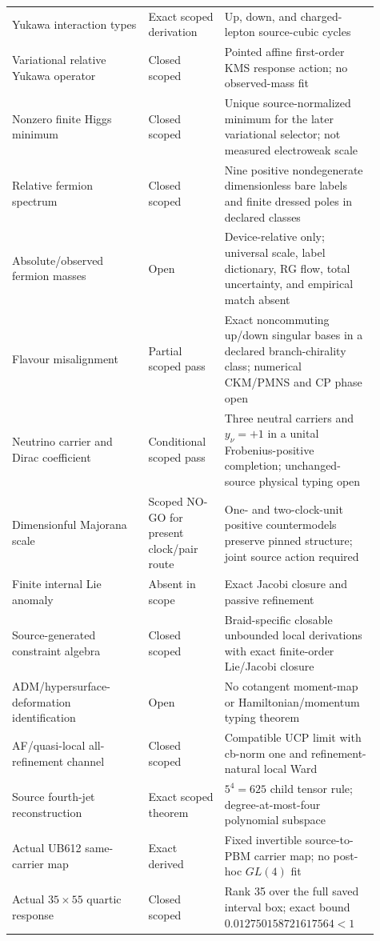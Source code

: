 \documentclass[11pt]{article}
\theoremstyle{definition}
\theoremstyle{remark}
\begin{document}
\begin{longtable}{>{\raggedright\arraybackslash}p{0.34\linewidth} >{\raggedright\arraybackslash}p{0.19\linewidth} >{\raggedright\arraybackslash}p{0.38\linewidth}}
Yukawa interaction types & Exact scoped derivation & Up, down, and charged-lepton source-cubic cycles \\
Variational relative Yukawa operator & Closed scoped & Pointed affine first-order KMS response action; no observed-mass fit \\
Nonzero finite Higgs minimum & Closed scoped & Unique source-normalized minimum for the later variational selector; not measured electroweak scale \\
Relative fermion spectrum & Closed scoped & Nine positive nondegenerate dimensionless bare labels and finite dressed poles in declared classes \\
Absolute/observed fermion masses & Open & Device-relative only; universal scale, label dictionary, RG flow, total uncertainty, and empirical match absent \\
Flavour misalignment & Partial scoped pass & Exact noncommuting up/down singular bases in a declared branch-chirality class; numerical CKM/PMNS and CP phase open \\
Neutrino carrier and Dirac coefficient & Conditional scoped pass & Three neutral carriers and $y_\nu=+1$ in a unital Frobenius-positive completion; unchanged-source physical typing open \\
Dimensionful Majorana scale & Scoped NO-GO for present clock/pair route & One- and two-clock-unit positive countermodels preserve pinned structure; joint source action required \\
Finite internal Lie anomaly & Absent in scope & Exact Jacobi closure and passive refinement \\
Source-generated constraint algebra & Closed scoped & Braid-specific closable unbounded local derivations with exact finite-order Lie/Jacobi closure \\
ADM/hypersurface-deformation identification & Open & No cotangent moment-map or Hamiltonian/momentum typing theorem \\
AF/quasi-local all-refinement channel & Closed scoped & Compatible UCP limit with cb-norm one and refinement-natural local Ward \\
Source fourth-jet reconstruction & Exact scoped theorem & $5^4=625$ child tensor rule; degree-at-most-four polynomial subspace \\
Actual UB612 same-carrier map & Exact derived & Fixed invertible source-to-PBM carrier map; no post-hoc $GL(4)$ fit \\
Actual $35\times55$ quartic response & Closed scoped & Rank 35 over the full saved interval box; exact bound $0.012750158721617564<1$ \\

\end{longtable}
\end{document}
